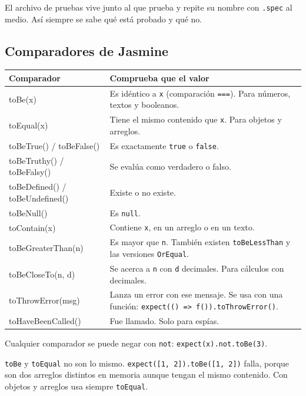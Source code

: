 \documentclass[11pt,a4paper]{article}
\newcommand{\cmd}[1]{\texttt{\color{reactdark}#1}}
\begin{document}
El archivo de pruebas vive junto al que prueba y repite su nombre con \cmd{.spec} al medio. Así siempre se sabe qué está probado y qué no.

\subsection{Comparadores de Jasmine}

\begin{center}
\small
\begin{tabular}{>{\ttfamily}l p{9.3cm}}
\toprule
\textrm{\textbf{Comparador}} & \textbf{Comprueba que el valor} \\
\midrule
toBe(x) & Es idéntico a \cmd{x} (comparación \cmd{===}). Para números, textos y booleanos. \\
toEqual(x) & Tiene el mismo contenido que \cmd{x}. Para objetos y arreglos. \\
toBeTrue() / toBeFalse() & Es exactamente \cmd{true} o \cmd{false}. \\
toBeTruthy() / toBeFalsy() & Se evalúa como verdadero o falso. \\
toBeDefined() / toBeUndefined() & Existe o no existe. \\
toBeNull() & Es \cmd{null}. \\
toContain(x) & Contiene \cmd{x}, en un arreglo o en un texto. \\
toBeGreaterThan(n) & Es mayor que \cmd{n}. También existen \cmd{toBeLessThan} y las versiones \cmd{OrEqual}. \\
toBeCloseTo(n, d) & Se acerca a \cmd{n} con \cmd{d} decimales. Para cálculos con decimales. \\
toThrowError(msg) & Lanza un error con ese mensaje. Se usa con una función: \cmd{expect(() => f()).toThrowError()}. \\
toHaveBeenCalled() & Fue llamado. Solo para espías. \\
\bottomrule
\end{tabular}
\end{center}

Cualquier comparador se puede negar con \cmd{not}: \cmd{expect(x).not.toBe(3)}.

\begin{atencion}
\cmd{toBe} y \cmd{toEqual} no son lo mismo. \cmd{expect([1, 2]).toBe([1, 2])} falla, porque son dos arreglos distintos en memoria aunque tengan el mismo contenido. Con objetos y arreglos usa siempre \cmd{toEqual}.
\end{atencion}
\end{document}
